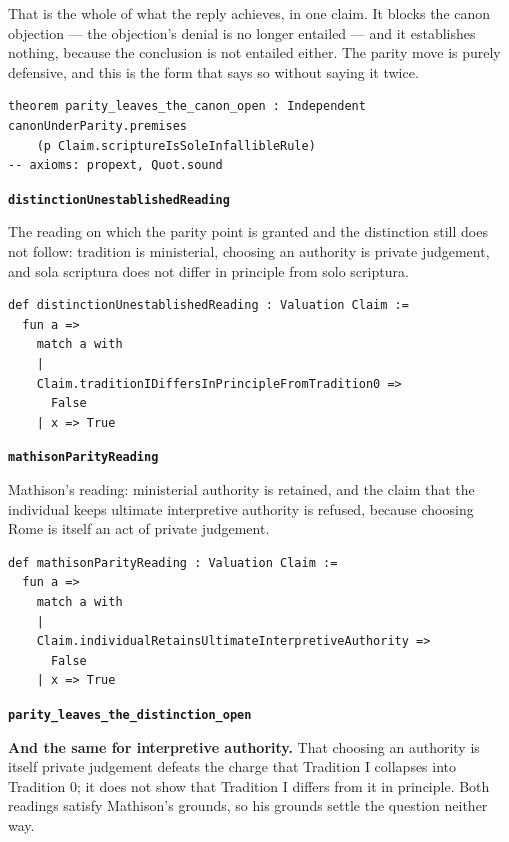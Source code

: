 \documentclass[11pt]{article}
\begin{document}
That is the whole of what the reply achieves, in one claim. It blocks the canon objection — the objection's denial is no longer entailed — and it establishes nothing, because the conclusion is not entailed either. The parity move is purely defensive, and this is the form that says so without saying it twice.

{\small\begin{verbatim}
theorem parity_leaves_the_canon_open : Independent canonUnderParity.premises
    (p Claim.scriptureIsSoleInfallibleRule)
-- axioms: propext, Quot.sound
\end{verbatim}}
\par\medskip\noindent\textbf{\texttt{distinction\allowbreak{}Unestablished\allowbreak{}Reading}}\par\nobreak\noindent
The reading on which the parity point is granted and the distinction still does not follow: tradition is ministerial, choosing an authority is private judgement, and sola scriptura does not differ in principle from solo scriptura.

{\small\begin{verbatim}
def distinctionUnestablishedReading : Valuation Claim :=
  fun a =>
    match a with
    |
    Claim.traditionIDiffersInPrincipleFromTradition0 =>
      False
    | x => True
\end{verbatim}}
\par\medskip\noindent\textbf{\texttt{mathison\allowbreak{}Parity\allowbreak{}Reading}}\par\nobreak\noindent
Mathison's reading: ministerial authority is retained, and the claim that the individual keeps ultimate interpretive authority is refused, because choosing Rome is itself an act of private judgement.

{\small\begin{verbatim}
def mathisonParityReading : Valuation Claim :=
  fun a =>
    match a with
    |
    Claim.individualRetainsUltimateInterpretiveAuthority =>
      False
    | x => True
\end{verbatim}}
\par\medskip\noindent\textbf{\texttt{parity\_\allowbreak{}leaves\_\allowbreak{}the\_\allowbreak{}distinction\_\allowbreak{}open}}\par\nobreak\noindent
\textbf{And the same for interpretive authority.} That choosing an authority is itself private judgement defeats the charge that Tradition I collapses into Tradition 0; it does not show that Tradition I differs from it in principle. Both readings satisfy Mathison's grounds, so his grounds settle the question neither way.
\end{document}
